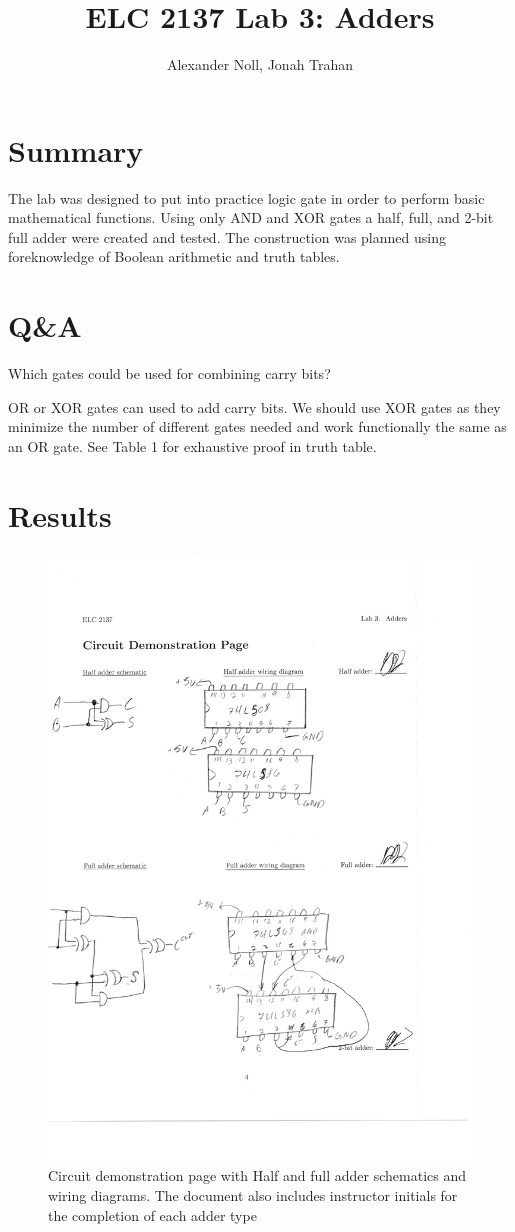 \documentclass[11pt]{article}
\begin{document}
\title{ELC 2137 Lab 3: Adders}
\author{Alexander Noll, Jonah Trahan}

\maketitle


\section*{Summary}

The lab was designed to put into practice logic gate in order to perform basic mathematical functions. Using only AND and XOR gates a half, full, and 2-bit full adder were created and tested. The construction was planned using foreknowledge of Boolean arithmetic and truth tables.


\section*{Q\&A}

Which gates could be used for combining carry bits?

OR or XOR gates can used to add carry bits. We should use XOR gates as they minimize the number of different gates needed and work functionally the same as an OR gate. See Table 1 for exhaustive proof in truth table.

\clearpage
\section*{Results}


\begin{figure}[!hb]\centering
	\includegraphics[width=.75\textwidth]{DiagramSheet} \caption{Circuit demonstration page with Half and full adder schematics and wiring diagrams. The document also includes instructor initials for the completion of each adder type}
\end{figure}
\end{document}
